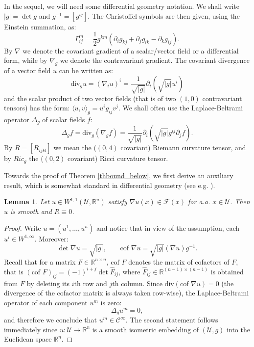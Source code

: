 \documentclass[leqno,twoside, 11pt]{amsart}
\theoremstyle{plain}
\newtheorem{lemma}[theorem]{Lemma}
\theoremstyle{definition}
\numberwithin{equation}{section}
\numberwithin{figure}{section}
\begin{document}
In the sequel, we will need some differential geometry notation.
We shall write $|g| = \det g$ and $g^{-1}=[g^{ij}]$.
The Christoffel symbols are then given, using the Einstein summation, as:
$$\Gamma^m_{ij} = \frac{1}{2} g^{km}(\partial_i g_{kj} + \partial_j g_{ik}
-\partial_kg_{ij}).$$
By $\nabla$ we denote the covariant gradient of a scalar/vector field or 
a differential form, while by $\nabla_g$ we denote the contravariant gradient. 
The covariant divergence of a vector field $u$ can be written as: 
$$\mbox{div}_g u = (\nabla_i u)^i = 
\frac{1}{\sqrt{|g|}} \partial_i (\sqrt{|g|} u^i)$$
and the scalar product of two  vector fields (that is of two 
$(1,0)$ contravariant tensors) has the form: 
$\langle u,v \rangle_g= u^i g_{ij} v^j$.
We shall often use
the Laplace-Beltrami operator $\Delta_g$ of scalar fields $f$:
$$\Delta_g f = \mbox{div}_g (\nabla_g f) =
\frac{1}{\sqrt{|g|}} \partial_i (\sqrt{|g|} g^{ij}\partial_j f).$$
By $R=[R_{ijkl}]$ we mean the ($(0,4)$ covariant)
Riemann curvature tensor, and by $Ric_g$ the ($(0,2)$ covariant) Ricci curvature 
tensor.

Towards the proof of Theorem \ref{thbound_below},
we first derive an auxiliary result, which is somewhat standard in
differential geometry (see e.g. \cite{reshetnyak, ciarlet_new}). 

\begin{lemma}\label{thsmoothandRicci}
Let $u\in W^{1,1}(\mathcal{U},\mathbb{R}^n)$ satisfy 
$\nabla u(x)\in \mathcal{F}(x)$ for a.a. $x\in\mathcal{U}$.  Then $u$ is smooth
and $R\equiv 0$.
\end{lemma}

\begin{proof}
Write $u=(u^1,\ldots, u^n)$ and notice that in view of the assumption, 
each $u^i\in W^{1,\infty}$. Moreover:
$$\det \nabla u = \sqrt{|g|}, \qquad 
\mbox{cof } \nabla u = \sqrt{|g|} (\nabla u) g^{-1}.$$
Recall that for a matrix $F\in\mathbb{R}^{n\times n}$, $\mbox{cof } F$ 
denotes the matrix of cofactors of $F$, that is 
$(\mbox{cof } F)_{ij} = (-1)^{i+j} \det \hat F_{ij}$, where 
$\hat F_{ij}\in\mathbb{R}^{(n-1)\times (n-1)}$ is obtained from $F$ by deleting 
its $i$th row and $j$th column.
Since $\mbox{div}(\mbox{cof } \nabla u) = 0$ (the divergence 
of the cofactor matrix is always taken row-wise), 
the Laplace-Beltrami operator of each component $u^m$ is zero:
$$\Delta_g u^m = 0,$$
and therefore we conclude that $u^m\in \mathcal{C}^\infty$. The second statement 
follows immediately since $u : \mathcal{U} \to \mathbb{R}^n$ is a smooth isometric embedding of  
$(\mathcal{U}, g)$ into the Euclidean space $\mathbb{R}^n$.
\end{proof}
\end{document}
